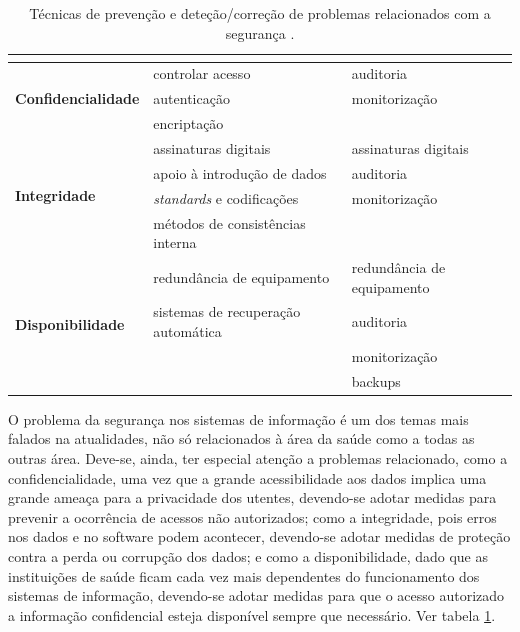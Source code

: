 \documentclass[conference]{IEEEtran}
\begin{document}
\begin{table}[!ht]
\centering
\caption{Técnicas de prevenção e deteção/correção de problemas relacionados com a segurança \cite{segurancaSI}.}
\label{tabl1}
\begin{adjustbox}{max width=\textwidth 	}
\begin{tabular}{ |l|l|l| }

\hline
	\multicolumn{1}{|c|}{\cellcolor[HTML]{EFEFEF}{\color[HTML]{333333}}}	&	\multicolumn{1}{|c|}{\cellcolor[HTML]{EFEFEF}{\color[HTML]{333333} \textbf{Prevenção}}}	&	\multicolumn{1}{|c|}{\cellcolor[HTML]{EFEFEF}{\color[HTML]{333333} \textbf{Deteção/Correção}}}	\\
\hline

\multirow{3}{*}{\textbf{Confidencialidade}}			&	controlar acesso					&	auditoria					\\
													&	autenticação						&	monitorização				\\
													&	encriptação							&								\\
\hline

\multirow{4}{*}{\textbf{Integridade}}				&	assinaturas digitais				&	assinaturas digitais		\\
													&	apoio à introdução de dados			&	auditoria					\\
													&	\textit{standards} e codificações	&	monitorização				\\
													&	métodos de consistências interna	&								\\
\hline

\multirow{4}{*}{\textbf{Disponibilidade}}			&	redundância de equipamento			&	redundância de equipamento	\\
													&	sistemas de recuperação automática	&	auditoria					\\
													&										&	monitorização				\\
													&										&	backups 					\\
\hline

\end{tabular}
\end{adjustbox}
\end{table}

O problema da segurança nos sistemas de informação é um dos temas mais falados na atualidades, não só relacionados à área da saúde como a todas as outras área. Deve-se, ainda, ter especial atenção a problemas relacionado, como a confidencialidade, uma vez que a grande acessibilidade aos dados implica uma grande ameaça para a privacidade dos utentes, devendo-se adotar medidas para prevenir a ocorrência de acessos não autorizados; como a integridade, pois erros nos dados e no software podem acontecer, devendo-se adotar medidas de proteção contra a perda ou corrupção dos dados; e como a disponibilidade, dado que as instituições de saúde ficam cada vez mais dependentes do funcionamento dos sistemas de informação, devendo-se adotar medidas para que o acesso autorizado a informação confidencial esteja disponível sempre que necessário. Ver tabela \ref{tabl1}.
\end{document}
